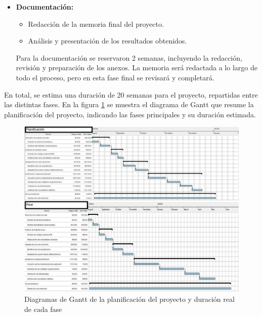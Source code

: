 \begin{itemize}
    \item \textbf{Documentación:}
    \begin{itemize}
        \item Redacción de la memoria final del proyecto.
        \item Análisis y presentación de los resultados obtenidos.
    \end{itemize}
    Para la documentación se reservaron 2 semanas, incluyendo la redacción, revisión y preparación de los anexos. La memoria será redactada a lo largo de todo el proceso, pero en esta fase final se revisará y completará.
\end{itemize}

En total, se estima una duración de 20 semanas para el proyecto, repartidas entre las distintas fases.
En la figura \ref{fig:planificacion_proxecto} se muestra el diagrama de Gantt que resume la planificación del proyecto, indicando las fases principales y su duración estimada.

\begin{figure}[tbp]
    \centering
    \includegraphics[height=1\textwidth, angle=90]{imaxes/gants-1.png}
    \caption{Diagramas de Gantt de la planificación del proyecto y duración real de cada fase}
    \label{fig:planificacion_proxecto}
\end{figure}

